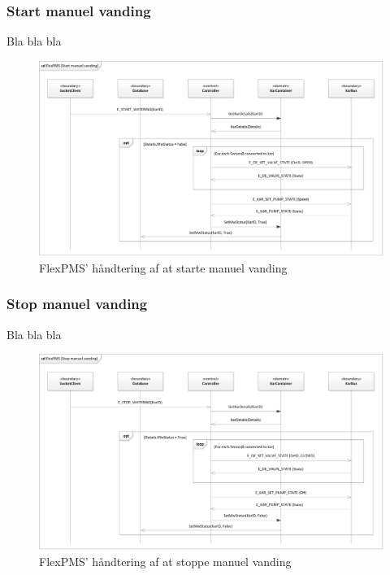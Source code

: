 
\subsubsection{Start manuel vanding}

Bla bla bla

\begin{figure}[H]
	\centering
	\includegraphics[scale=.6]{SoftwareArkitektur/FlexPMS/Diagrammer/Case_StartManuelVanding.png}
	\caption{FlexPMS' håndtering af at starte manuel vanding}
	\label{photo:OpenOValveUseCase}
\end{figure}


\subsubsection{Stop manuel vanding}

Bla bla bla

\begin{figure}[H]
	\centering
	\includegraphics[scale=.6]{SoftwareArkitektur/FlexPMS/Diagrammer/Case_StopManuelVanding.png}
	\caption{FlexPMS' håndtering af at stoppe manuel vanding}
	\label{photo:OpenOValveUseCase}
\end{figure}


